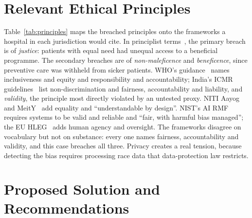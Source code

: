 \documentclass[conference]{IEEEtran}
\begin{document}
\section{Relevant Ethical Principles}
Table~\ref{tab:principles} maps the breached principles onto the frameworks a hospital in each jurisdiction would cite. In principlist terms~\cite{beauchamp2019}, the primary breach is of \emph{justice}: patients with equal need had unequal access to a beneficial programme. The secondary breaches are of \emph{non-maleficence} and \emph{beneficence}, since preventive care was withheld from sicker patients. WHO's guidance~\cite{who2021} names inclusiveness and equity and responsibility and accountability; India's ICMR guidelines~\cite{icmr2023} list non-discrimination and fairness, accountability and liability, and \emph{validity}, the principle most directly violated by an untested proxy. NITI Aayog~\cite{niti2021} and MeitY~\cite{meity2025} add equality and ``understandable by design''. NIST's AI RMF~\cite{nist2023} requires systems to be valid and reliable and ``fair, with harmful bias managed''; the EU HLEG~\cite{hleg2019} adds human agency and oversight. The frameworks disagree on vocabulary but not on substance: every one names fairness, accountability and validity, and this case breaches all three. Privacy creates a real tension, because detecting the bias requires processing race data that data-protection law restricts.



\section{Proposed Solution and Recommendations}
\end{document}
